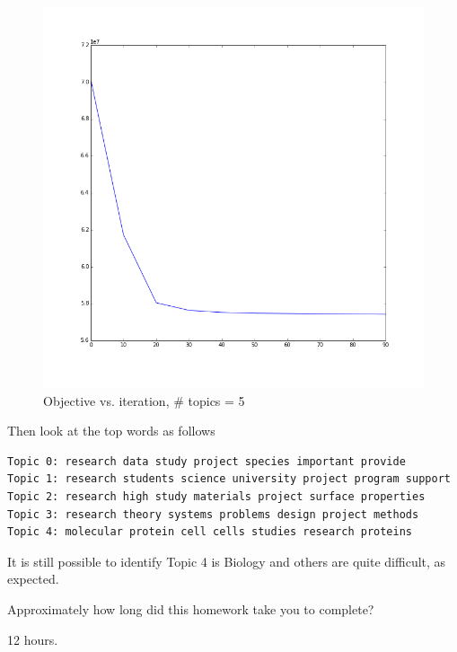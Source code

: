 \documentclass[submit]{harvardml}
\begin{document}
\begin{figure}[h]
    \centering
    \includegraphics[scale=0.45]{prob4-5.png}
    \caption{Objective vs. iteration, \# topics = 5}
\end{figure}

Then look at the top words as follows

\begin{lstlisting}
Topic 0: research data study project species important provide
Topic 1: research students science university project program support
Topic 2: research high study materials project surface properties
Topic 3: research theory systems problems design project methods
Topic 4: molecular protein cell cells studies research proteins
\end{lstlisting}

It is still possible to identify Topic 4 is Biology and others are quite difficult, as expected.

\newpage
\begin{problem}[Calibration, 1pt]
Approximately how long did this homework take you to complete?
\end{problem}
12 hours.
\end{document}

